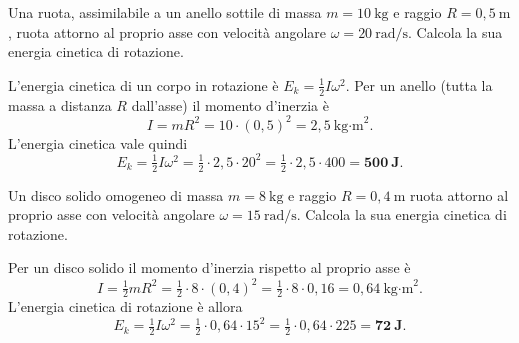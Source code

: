
\begin{question}[ID=4.1, subtitle={Energia cinetica di rotazione di una ruota}, tags={corpo rigido, energia cinetica rotazionale}, difficulty=facile]
Una ruota, assimilabile a un anello sottile di massa $m = 10\ \text{kg}$ e raggio $R = 0{,}5\ \text{m}$, ruota attorno al proprio asse con velocità angolare $\omega = 20\ \text{rad/s}$. Calcola la sua energia cinetica di rotazione.
\begin{solution}
L'energia cinetica di un corpo in rotazione è $E_k = \tfrac{1}{2}I\omega^2$. Per un anello (tutta la massa a distanza $R$ dall'asse) il momento d'inerzia è
\[
I = mR^2 = 10\cdot (0{,}5)^2 = 2{,}5\ \text{kg·m}^2.
\]
L'energia cinetica vale quindi
\[
E_k = \tfrac{1}{2}I\omega^2 = \tfrac{1}{2}\cdot 2{,}5\cdot 20^2 = \tfrac{1}{2}\cdot 2{,}5\cdot 400 = \mathbf{500\ \text{J}}.
\]
\end{solution}
\end{question}


\begin{question}[ID=4.2, subtitle={Energia cinetica di rotazione di un disco solido}, tags={corpo rigido, energia cinetica rotazionale, disco}, difficulty=facile]
Un disco solido omogeneo di massa $m = 8\ \text{kg}$ e raggio $R = 0{,}4\ \text{m}$ ruota attorno al proprio asse con velocità angolare $\omega = 15\ \text{rad/s}$. Calcola la sua energia cinetica di rotazione.
\begin{solution}
Per un disco solido il momento d'inerzia rispetto al proprio asse è
\[
I = \tfrac{1}{2}mR^2 = \tfrac{1}{2}\cdot 8\cdot (0{,}4)^2 = \tfrac{1}{2}\cdot 8\cdot 0{,}16 = 0{,}64\ \text{kg·m}^2.
\]
L'energia cinetica di rotazione è allora
\[
E_k = \tfrac{1}{2}I\omega^2 = \tfrac{1}{2}\cdot 0{,}64\cdot 15^2 = \tfrac{1}{2}\cdot 0{,}64\cdot 225 = \mathbf{72\ \text{J}}.
\]
\end{solution}
\end{question}


